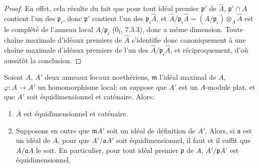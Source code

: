\begin{proof}
En effet, cela résulte du fait que pour tout idéal premier $\mathfrak p'$ de
$\widehat A$, $\mathfrak p'\cap A$ contient l'un des $\mathfrak p_i$, donc
$\mathfrak p'$ contient l'un des $\mathfrak p_i\widehat A$, et
$\widehat A/\mathfrak p_i\widehat A=(A/\mathfrak p_i)\otimes_A\widehat A$
est le complété de l'anneau local $A/\mathfrak p_i$ (0$_{\mathrm I}$,
7.3.3), donc a même dimension. Toute chaîne maximale d'idéaux premiers de
$\widehat A$ s'identifie donc canoniquement à une chaîne maximale d'idéaux
premiers de l'un des $\widehat A/\mathfrak p_i\widehat A$, et réciproquement,
d'où aussitôt la conclusion.
\end{proof}

\begin{proposition}[7.1.3]
\label{IV.2.s7.1.3-fr}
Soient $A$, $A'$ deux anneaux locaux noethériens, $\mathfrak m$ l'idéal
maximal de $A$, $\varphi:A\to A'$ un homomorphisme local; on suppose que $A'$
est un $A$-module plat, et que $A'$ soit équidimensionnel et caténaire. Alors:
\begin{enumerate}
\item[(i)] $A$ est équidimensionnel et caténaire.
\item[(ii)] Supposons en outre que $\mathfrak mA'$ soit un idéal de définition de
$A'$. Alors, si $\mathfrak a$ est un idéal de $A$, pour que
$A'/\mathfrak aA'$ soit équidimensionnel, il faut et il suffit que
$A/\mathfrak aA$ le soit. En particulier, pour tout idéal premier
$\mathfrak p$ de $A$, $A'/\mathfrak pA'$ est équidimensionnel.
\end{enumerate}
\end{proposition}

